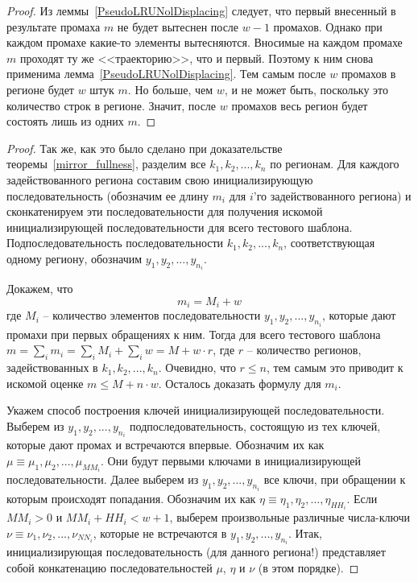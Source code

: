 \theoremtext{\ref{thm:PseudoLRU_essential}}{\PseudoLRUEssential}
\begin{proof}
    Из леммы~\ref{PseudoLRUNolDisplacing} следует, что первый внесенный в результате промаха $m$ не будет вытеснен после $w{-}1$ промахов. Однако при каждом промахе какие-то элементы вытесняются. Вносимые на каждом промахе $m$ проходят ту же <<траекторию>>, что и первый. Поэтому к ним снова применима лемма~\ref{PseudoLRUNolDisplacing}. Тем самым после $w$ промахов в регионе будет $w$ штук $m$. Но больше, чем $w$, и не может быть, поскольку это количество строк в регионе. Значит, после $w$ промахов весь регион будет состоять лишь из одних $m$.
\end{proof}

\theoremtext{\ref{thm_mirror_lenth_lru}}{\UpperBoundLRUMirror}
\begin{proof}
  Так же, как это было сделано при доказательстве
  теоремы~\ref{mirror_fullness}, разделим все $k_1, k_2, ..., k_n$
  по регионам. Для каждого задействованного региона составим свою
  инициализирующую последовательность (обозначим ее длину $m_i$
  для $i$'го задействованного региона) и сконкатенируем эти
  последовательности для получения искомой инициализирующей последовательности
   для всего тестового шаблона.
  Подпоследовательность последовательности $k_1, k_2, ..., k_n$,
  соответствующая одному региону, обозначим $y_1, y_2, ...,
  y_{n_i}$.

  Докажем, что $$m_i = M_i + w$$ где $M_i$ -- количество
  элементов последовательности $y_1, y_2, ..., y_{n_i}$, которые дают
  промахи при первых обращениях к ним. Тогда для всего тестового
  шаблона $m = \sum\limits_i m_i = \sum\limits_i M_i + \sum\limits_i w =
  M + w \cdot r$, где $r$ -- количество регионов, задействованных в
  $k_1, k_2, ..., k_n$. Очевидно, что $r \leqslant n$, тем самым это
  приводит к искомой оценке $m \leqslant M + n \cdot w$. Осталось
  доказать формулу для $m_i$.

  Укажем способ построения ключей инициализирующей последовательности. Выберем из $y_1, y_2, ..., y_{n_i}$ подпоследовательность,
  состоящую из тех ключей, которые дают промах и встречаются
  впервые. Обозначим их как $\mu \equiv \mu_1, \mu_2, ..., \mu_{MM_i}$. Они будут первыми ключами в   инициализирующей последовательности. Далее выберем из $y_1, y_2, ..., y_{n_i}$
  все ключи, при обращении к которым происходят попадания.
  Обозначим их как $\eta \equiv \eta_1, \eta_2, ..., \eta_{HH_i}$. Если $MM_i > 0$ и $MM_i +
  HH_i < w + 1$, выберем произвольные различные числа-ключи $\nu \equiv \nu_1, \nu_2,
  ..., \nu_{NN_i}$, которые не встречаются в $y_1, y_2, ..., y_{n_i}$. Итак, инициализирующая последовательность (для данного региона!) представляет собой конкатенацию последовательностей $\mu$, $\eta$ и $\nu$ (в этом порядке).


\end{proof}
